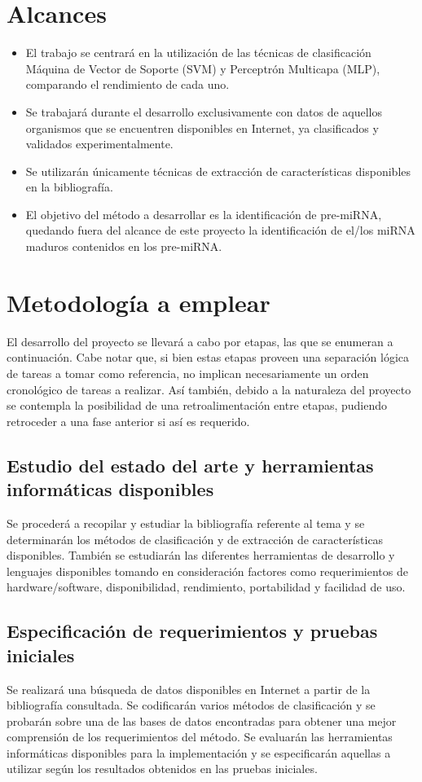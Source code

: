 \documentclass[12pt,bibliography=oldstyle,DIV=14,parskip=full-,titlepage]{scrartcl}
\begin{document}
\section{Alcances}
\begin{itemize}
\item El trabajo se centrará en la utilización de las técnicas de
  clasificación Máquina de Vector de Soporte (SVM) y Perceptrón
  Multicapa (MLP), comparando el rendimiento de cada uno.
\item Se trabajará durante el desarrollo exclusivamente con datos de
  aquellos organismos que se encuentren disponibles en Internet, ya
  clasificados y validados experimentalmente.
\item Se utilizarán únicamente técnicas de extracción de
  características disponibles en la bibliografía.
\item El objetivo del método a desarrollar es la identificación de
  pre-miRNA, quedando fuera del alcance de este proyecto la
  identificación de el/los miRNA maduros contenidos en los pre-miRNA.
\end{itemize}
%
%
\section{Metodología a emplear}
El desarrollo del proyecto se llevará a cabo por etapas, las que se
enumeran a continuación.  Cabe notar que, si bien estas etapas proveen
una separación lógica de tareas a tomar como referencia, no implican
necesariamente un orden cronológico de tareas a realizar. Así también,
debido a la naturaleza del proyecto se contempla la posibilidad de una
retroalimentación entre etapas, pudiendo retroceder a una fase
anterior si así es requerido.
%
\subsection{Estudio del estado del arte y herramientas informáticas
  disponibles}
Se procederá a recopilar y estudiar la bibliografía referente al tema
y se determinarán los métodos de clasificación y de extracción de
características disponibles. También se estudiarán las diferentes
herramientas de desarrollo y lenguajes disponibles tomando en
consideración factores como requerimientos de hardware/software,
disponibilidad, rendimiento, portabilidad y facilidad de uso.
%
\subsection{Especificación de requerimientos y pruebas iniciales}
Se realizará una búsqueda de datos disponibles en Internet a partir de
la bibliografía consultada.  Se codificarán varios métodos de
clasificación y se probarán sobre una de las bases de datos
encontradas para obtener una mejor comprensión de los requerimientos
del método.
%
Se evaluarán las herramientas informáticas disponibles para la
implementación y se especificarán aquellas a utilizar según los
resultados obtenidos en las pruebas iniciales.
%
\end{document}
